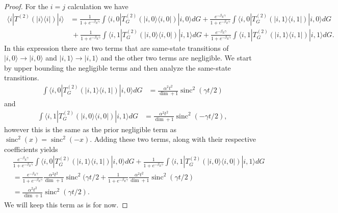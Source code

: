 \documentclass{article}
\newcommand{\ket}[1]{|#1\rangle}
\newcommand{\bra}[1]{\langle #1|}
\newcommand{\ketbra}[2]{| #1\rangle\! \langle #2|}
\DeclareMathOperator{\sinc}{sinc}
\begin{document}
\begin{proof}
    For the $i = j$ calculation we have
    \begin{align}
        \bra{i} T^{(2)}(\ketbra{i}{i}) \ket{i} &= \frac{1}{1 + e^{-\beta_E \gamma}} \int \bra{i, 0} T^{(2)}_G (\ketbra{i, 0}{i, 0}) \ket{i, 0} dG + \frac{e^{-\beta_E \gamma}}{1 + e^{-\beta_E \gamma}} \int \bra{i, 0} T^{(2)}_G (\ketbra{i, 1}{i, 1}) \ket{i, 0} dG \nonumber \\
        &~+ \frac{1}{1 + e^{-\beta_E \gamma}} \int \bra{i, 1} T^{(2)}_G (\ketbra{i, 0}{i, 0}) \ket{i, 1} dG + \frac{e^{-\beta_E \gamma}}{1 + e^{-\beta_E \gamma}} \int \bra{i, 1} T^{(2)}_G (\ketbra{i, 1}{i, 1}) \ket{i, 1} dG . \label{eq:same_state_transition_with_env}
    \end{align}
    In this expression there are two terms that are same-state transitions of $\ket{i, 0} \to \ket{i, 0}$ and $\ket{i, 1} \to \ket{i,1}$ and the other two terms are negligible. We start by upper bounding the negligible terms and then analyze the same-state transitions.
    \begin{align}
        \int \bra{i, 0} T^{(2)}_G (\ketbra{i, 1}{i, 1}) \ket{i, 0} dG &= \frac{\alpha^2 t^2}{\dim + 1} \sinc^2(\gamma t/ 2)
    \end{align}
    and 
    \begin{align}
        \int \bra{i, 1} T^{(2)}_G (\ketbra{i, 0}{i, 0}) \ket{i, 1} dG &= \frac{\alpha^2 t^2}{\dim + 1} \sinc^2(-\gamma t/ 2),
    \end{align}
    however this is the same as the prior negligible term as $\sinc^2(x) = \sinc^2(-x)$. Adding these two terms, along with their respective coefficients yields
    \begin{align}
        &\frac{e^{-\beta_E \gamma}}{1 + e^{-\beta_E \gamma}} \int \bra{i, 0} T^{(2)}_G (\ketbra{i, 1}{i, 1}) \ket{i, 0} dG + \frac{1}{1 + e^{-\beta_E \gamma}} \int \bra{i, 1} T^{(2)}_G (\ketbra{i, 0}{i, 0}) \ket{i, 1} dG \\
        &= \frac{e^{-\beta_E \gamma}}{1 + e^{-\beta_E \gamma}} \frac{\alpha^2 t^2}{\dim + 1} \sinc^2(\gamma t/ 2 + \frac{1}{1 + e^{-\beta_E \gamma}}\frac{\alpha^2 t^2}{\dim + 1} \sinc^2(\gamma t/ 2) \\
        &= \frac{\alpha^2 t^2}{\dim + 1} \sinc^2(\gamma t/ 2). \label{eq:t_2_same_state_1}
    \end{align}
    We will keep this term as is for now. 


\end{proof}
\end{document}
